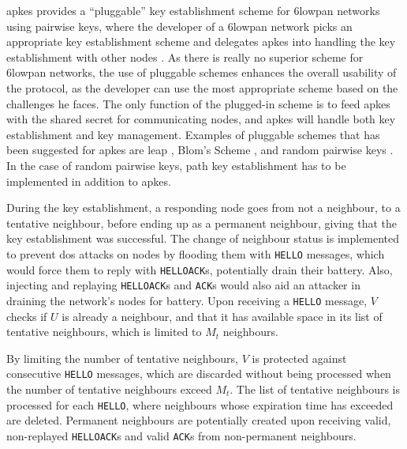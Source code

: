 \gls{apkes} provides a ``pluggable'' key establishment scheme for \gls{6lowpan} networks using pairwise keys, where the developer of a \gls{6lowpan} network picks an appropriate key establishment scheme and delegates \gls{apkes} into handling the key establishment with other nodes \cite{krentz20136lowpan}. As there is really no superior scheme for \gls{6lowpan} networks, the use of pluggable schemes enhances the overall usability of the protocol, as the developer can use the most appropriate scheme based on the challenges he faces. The only function of the plugged-in scheme is to feed \gls{apkes} with the shared secret for communicating nodes, and \gls{apkes} will handle both key establishment and key management. Examples of pluggable schemes that has been suggested for \gls{apkes} are \gls{leap} \cite{zhu2006leap+}, Blom's Scheme \cite{blom1984optimal}, and random pairwise keys \cite{chan2003random}. In the case of random pairwise keys, path key establishment has to be implemented in addition to \gls{apkes}.




During the key establishment, a responding node goes from not a neighbour, to a tentative neighbour, before ending up as a permanent neighbour, giving that the key establishment was successful. The change of neighbour status is implemented to prevent \gls{dos} attacks on nodes by flooding them with \texttt{HELLO} messages, which would force them to reply with \texttt{HELLOACK}s, potentially drain their battery. Also, injecting and replaying \texttt{HELLOACK}s and \texttt{ACK}s would also aid an attacker in draining the network's nodes for battery. Upon receiving a \texttt{HELLO} message, $V$ checks if $U$ is already a neighbour, and that it has available space in its list of tentative neighbours, which is limited to $M_t$ neighbours. 

By limiting the number of tentative neighbours, $V$ is protected against consecutive \texttt{HELLO} messages, which are discarded without being processed when the number of tentative neighbours exceed $M_t$. The list of tentative neighbours is processed for each \texttt{HELLO}, where neighbours whose expiration time has exceeded are deleted. Permanent neighbours are potentially created upon receiving valid, non-replayed \texttt{HELLOACK}s and valid \texttt{ACK}s from non-permanent neighbours. 



